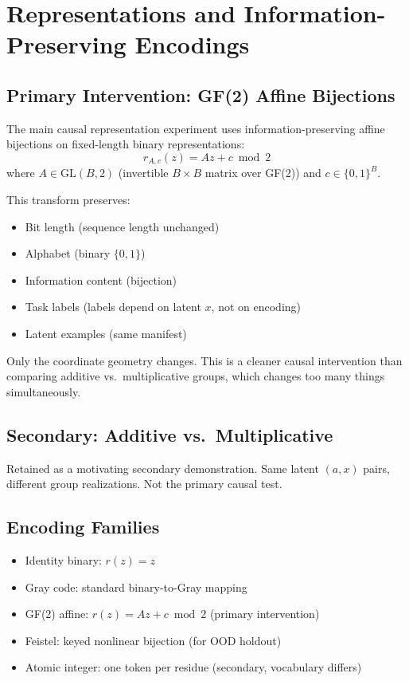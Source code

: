 \documentclass[11pt]{article}
\begin{document}
\section{Representations and Information-Preserving Encodings}\label{sec:encodings}

\subsection{Primary Intervention: GF(2) Affine Bijections}

The main causal representation experiment uses information-preserving affine bijections on fixed-length binary representations:
\begin{equation}
r_{A,c}(z) = Az + c \bmod 2
\end{equation}
where $A \in \text{GL}(B, 2)$ (invertible $B \times B$ matrix over GF(2)) and $c \in \{0,1\}^B$.

This transform preserves:
\begin{itemize}[leftmargin=*]
    \item Bit length (sequence length unchanged)
    \item Alphabet (binary $\{0,1\}$)
    \item Information content (bijection)
    \item Task labels (labels depend on latent $x$, not on encoding)
    \item Latent examples (same manifest)
\end{itemize}

Only the coordinate geometry changes. This is a cleaner causal intervention than comparing additive vs.\ multiplicative groups, which changes too many things simultaneously.

\subsection{Secondary: Additive vs.\ Multiplicative}

Retained as a motivating secondary demonstration. Same latent $(a, x)$ pairs, different group realizations. Not the primary causal test.

\subsection{Encoding Families}

\begin{itemize}[leftmargin=*]
    \item Identity binary: $r(z) = z$
    \item Gray code: standard binary-to-Gray mapping
    \item GF(2) affine: $r(z) = Az + c \bmod 2$ (primary intervention)
    \item Feistel: keyed nonlinear bijection (for OOD holdout)
    \item Atomic integer: one token per residue (secondary, vocabulary differs)
\end{itemize}
\end{document}
